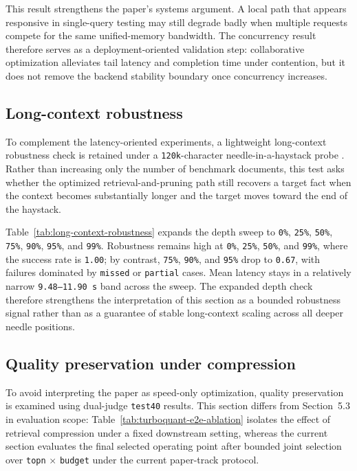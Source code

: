 \documentclass[10pt,twocolumn]{article}
\begin{document}
This result strengthens the paper's systems argument. A local path that appears responsive in single-query testing may still degrade badly when multiple requests compete for the same unified-memory bandwidth. The concurrency result therefore serves as a deployment-oriented validation step: collaborative optimization alleviates tail latency and completion time under contention, but it does not remove the backend stability boundary once concurrency increases.

\subsection{Long-context robustness}

To complement the latency-oriented experiments, a lightweight long-context robustness check is retained under a \texttt{120k}-character needle-in-a-haystack probe \cite{hsieh2024ruler}. Rather than increasing only the number of benchmark documents, this test asks whether the optimized retrieval-and-pruning path still recovers a target fact when the context becomes substantially longer and the target moves toward the end of the haystack.



Table~\ref{tab:long-context-robustness} expands the depth sweep to \texttt{0\%}, \texttt{25\%}, \texttt{50\%}, \texttt{75\%}, \texttt{90\%}, \texttt{95\%}, and \texttt{99\%}. Robustness remains high at \texttt{0\%}, \texttt{25\%}, \texttt{50\%}, and \texttt{99\%}, where the success rate is \texttt{1.00}; by contrast, \texttt{75\%}, \texttt{90\%}, and \texttt{95\%} drop to \texttt{0.67}, with failures dominated by \texttt{missed} or \texttt{partial} cases. Mean latency stays in a relatively narrow \texttt{9.48--11.90 s} band across the sweep. The expanded depth check therefore strengthens the interpretation of this section as a bounded robustness signal rather than as a guarantee of stable long-context scaling across all deeper needle positions.

\subsection{Quality preservation under compression}

To avoid interpreting the paper as speed-only optimization, quality preservation is examined using dual-judge \texttt{test40} results. This section differs from Section~5.3 in evaluation scope: Table~\ref{tab:turboquant-e2e-ablation} isolates the effect of retrieval compression under a fixed downstream setting, whereas the current section evaluates the final selected operating point after bounded joint selection over \texttt{topn} $\times$ \texttt{budget} under the current paper-track protocol.
\end{document}
